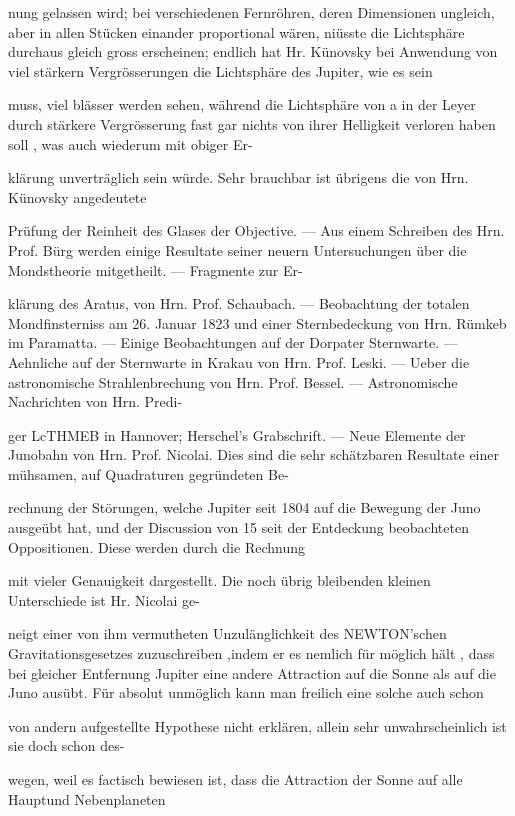 \documentclass[10pt,a4paper]{article}
\begin{document}
nung gelassen wird; bei verschiedenen Fernröhren, deren Dimensionen ungleich, aber in allen Stücken einander proportional wären, niüsste die Lichtsphäre durchaus gleich gross erscheinen; endlich hat Hr. Künovsky bei Anwendung von viel stärkern Vergrösserungen die Lichtsphäre des Jupiter, wie es sein

muss, viel blässer werden sehen, während die Lichtsphäre von a in der Leyer durch stärkere Vergrösserung fast gar nichts von ihrer Helligkeit verloren haben soll , was auch wiederum mit obiger Er-

klärung unverträglich sein würde. Sehr brauchbar ist übrigens die von Hrn. Künovsky angedeutete

Prüfung der Reinheit des Glases der Objective. — Aus einem Schreiben des Hrn. Prof. Bürg werden einige Resultate seiner neuern Untersuchungen über die Mondstheorie mitgetheilt. — Fragmente zur Er-

klärung des Aratus, von Hrn. Prof. Schaubach. — Beobachtung der totalen Mondfinsterniss am 26. Januar 1823 und einer Sternbedeckung von Hrn. Rümkeb im Paramatta. — Einige Beobachtungen auf der Dorpater Sternwarte. — Aehnliche auf der Sternwarte in Krakau von Hrn. Prof. Leski. — Ueber die astronomische Strahlenbrechung von Hrn. Prof. Bessel. — Astronomische Nachrichten von Hrn. Predi-

ger LcTHMEB in Hannover; Herschel's Grabschrift. — Neue Elemente der Junobahn von Hrn. Prof. Nicolai. Dies sind die sehr schätzbaren Resultate einer mühsamen, auf Quadraturen gegründeten Be-

rechnung der Störungen, welche Jupiter seit 1804 auf die Bewegung der Juno ausgeübt hat, und der Discussion von 15 seit der Entdeckung beobachteten Oppositionen. Diese werden durch die Rechnung

mit vieler Genauigkeit dargestellt. Die noch übrig bleibenden kleinen Unterschiede ist Hr. Nicolai ge-

neigt einer von ihm vermutheten Unzulänglichkeit des NEWTON'schen Gravitationsgesetzes zuzuschreiben ,indem er es nemlich für möglich hält , dass bei gleicher Entfernung Jupiter eine andere Attraction auf die Sonne als auf die Juno ausübt. Für absolut unmöglich kann man freilich eine solche auch schon

von andern aufgestellte Hypothese nicht erklären, allein sehr unwahrscheinlich ist sie doch schon des-

wegen, weil es factisch bewiesen ist, dass die Attraction der Sonne auf alle Hauptund Nebenplaneten
\end{document}
